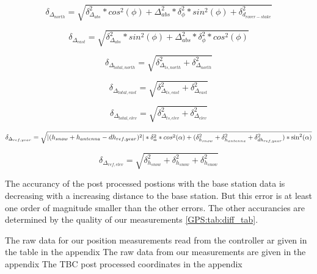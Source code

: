 \begin{equation}
	\delta_{\Delta_{north}} = \sqrt{\delta_{\Delta_{abs}}^2 * cos^2(\phi) + \Delta_{abs}^2 * \delta_{\phi}^2 * sin^2(\phi) + \delta_{d_{rover-stake}}^2}
\end{equation}

\begin{equation}
	\delta_{\Delta_{east}} = \sqrt{\delta_{\Delta_{abs}}^2 * sin^2(\phi) + \Delta_{abs}^2 * \delta_{\phi}^2 * cos^2(\phi)}
\end{equation}

\begin{equation}
	\delta_{\Delta_{total,north}} = \sqrt{\delta_{\Delta_{ts,north}}^2 + \delta_{\Delta_{north}}^2}
\end{equation}

\begin{equation}
	\delta_{\Delta_{total,east}} = \sqrt{\delta_{\Delta_{ts,east}}^2 + \delta_{\Delta_{east}}^2}
\end{equation}

\begin{equation}
	\delta_{\Delta_{total,elev}} = \sqrt{\delta_{\Delta_{ts,elev}}^2 +\delta_{\Delta_{elev}}^2}
\end{equation}

\begin{equation}
\delta_{\Delta_{ref,year}} = \sqrt{\left|(h_{snow} + h_{antenna} - dh_{ref,year})^2\right| * \delta_{\alpha}^2 * cos^2(\alpha)\\
+ (\delta_{h_{snow}}^2 + \delta_{h_{antenna}}^2 + \delta_{dh_{ref,year}}^2) * \sin^2(\alpha)}
\end{equation}

\begin{equation}
	\delta_{\Delta_{ref, elev}} = \sqrt{\delta_{h_{snow}}^2 + \delta_{h_{snow}}^2 + \delta_{h_{snow}}^2}
\end{equation}


The accurancy of the post processed postions with the base station data is decreasing with a increasing distance to the base station. 
But this error is at least one order of magnitude smaller than the other errors. 
The other accurancies are determined by the quality of our measurements \ref{GPS:tab:diff_tab}.


The raw data for our position measurements read from the controller ar given in the table in the appendix 
The raw data from our measurements are given in the appendix
The TBC post processed coordinates in the appendix 

